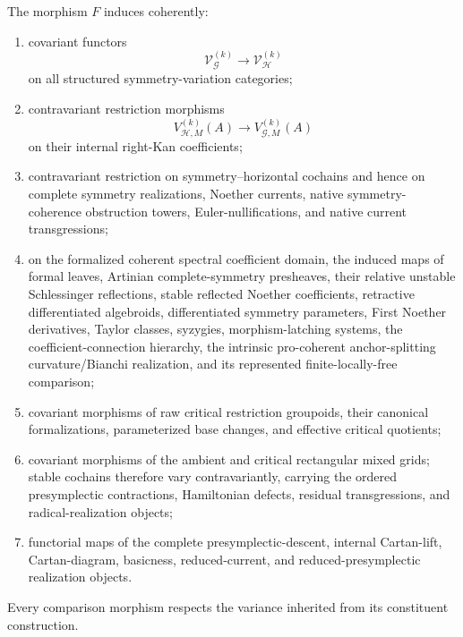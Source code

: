 \begin{theorem}
\label{thm:symmetry-noether-fixed-field-variance}
The morphism $F$ induces coherently:
\begin{enumerate}
\item covariant functors
      \[
      \mathcal V_{\mathcal G}^{(k)}
      \longrightarrow
      \mathcal V_{\mathcal H}^{(k)}
      \]
      on all structured symmetry-variation categories;
\item contravariant restriction morphisms
      \[
      V_{\mathcal H,M}^{(k)}(A)
      \longrightarrow
      V_{\mathcal G,M}^{(k)}(A)
      \]
      on their internal right-Kan coefficients;
\item contravariant restriction on symmetry--horizontal cochains and hence on
      complete symmetry realizations, Noether currents, native
      symmetry-coherence obstruction towers, Euler-nullifications, and native
      current transgressions;
\item on the formalized coherent spectral coefficient domain, the induced maps of
      formal leaves, Artinian complete-symmetry presheaves, their relative unstable
      Schlessinger reflections, stable reflected Noether coefficients, retractive
      differentiated algebroids, differentiated symmetry parameters, First Noether
      derivatives, Taylor classes, syzygies, morphism-latching systems, the
      coefficient-connection hierarchy, the intrinsic pro-coherent anchor-splitting
      curvature/Bianchi realization, and its represented finite-locally-free
      comparison;
\item covariant morphisms of raw critical restriction groupoids, their canonical
      formalizations, parameterized base changes, and effective critical quotients;
\item covariant morphisms of the ambient and critical rectangular mixed grids;
      stable cochains therefore vary contravariantly, carrying the ordered
      presymplectic contractions, Hamiltonian defects, residual transgressions, and
      radical-realization objects;
\item functorial maps of the complete presymplectic-descent, internal Cartan-lift,
      Cartan-diagram, basicness, reduced-current, and reduced-presymplectic
      realization objects.
\end{enumerate}
Every comparison morphism respects the variance inherited from its constituent
construction.
\end{theorem}

